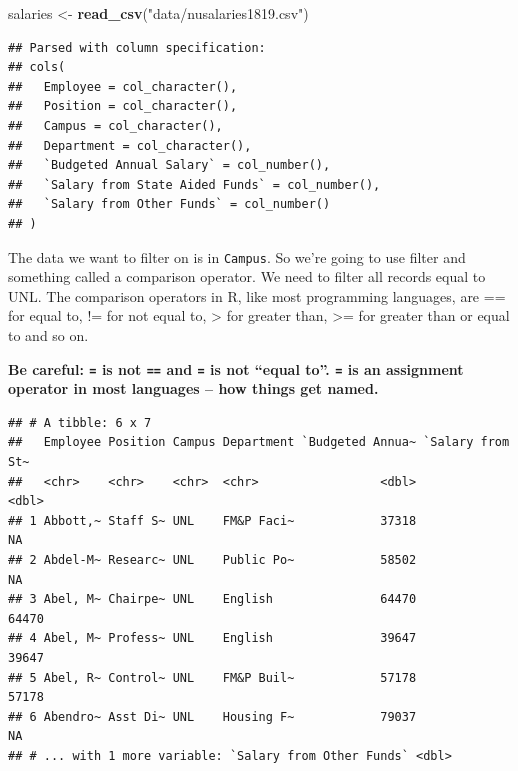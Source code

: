 \documentclass[]{book}
\newenvironment{Shaded}{\begin{snugshade}}{\end{snugshade}}
\newcommand{\KeywordTok}[1]{\textcolor[rgb]{0.13,0.29,0.53}{\textbf{#1}}}
\newcommand{\NormalTok}[1]{#1}
\newcommand{\OperatorTok}[1]{\textcolor[rgb]{0.81,0.36,0.00}{\textbf{#1}}}
\newcommand{\StringTok}[1]{\textcolor[rgb]{0.31,0.60,0.02}{#1}}
\begin{document}
\begin{Shaded}
\begin{Highlighting}[]
\NormalTok{salaries <-}\StringTok{ }\KeywordTok{read_csv}\NormalTok{(}\StringTok{"data/nusalaries1819.csv"}\NormalTok{)}
\end{Highlighting}
\end{Shaded}

\begin{verbatim}
## Parsed with column specification:
## cols(
##   Employee = col_character(),
##   Position = col_character(),
##   Campus = col_character(),
##   Department = col_character(),
##   `Budgeted Annual Salary` = col_number(),
##   `Salary from State Aided Funds` = col_number(),
##   `Salary from Other Funds` = col_number()
## )
\end{verbatim}

The data we want to filter on is in \texttt{Campus}. So we're going to use filter and something called a comparison operator. We need to filter all records equal to UNL. The comparison operators in R, like most programming languages, are == for equal to, != for not equal to, \textgreater{} for greater than, \textgreater{}= for greater than or equal to and so on.

\textbf{Be careful: \texttt{=} is not \texttt{==} and \texttt{=} is not ``equal to''. \texttt{=} is an assignment operator in most languages -- how things get named.}

\begin{Shaded}
\end{Shaded}

\begin{verbatim}
## # A tibble: 6 x 7
##   Employee Position Campus Department `Budgeted Annua~ `Salary from St~
##   <chr>    <chr>    <chr>  <chr>                 <dbl>            <dbl>
## 1 Abbott,~ Staff S~ UNL    FM&P Faci~            37318               NA
## 2 Abdel-M~ Researc~ UNL    Public Po~            58502               NA
## 3 Abel, M~ Chairpe~ UNL    English               64470            64470
## 4 Abel, M~ Profess~ UNL    English               39647            39647
## 5 Abel, R~ Control~ UNL    FM&P Buil~            57178            57178
## 6 Abendro~ Asst Di~ UNL    Housing F~            79037               NA
## # ... with 1 more variable: `Salary from Other Funds` <dbl>
\end{verbatim}
\end{document}
